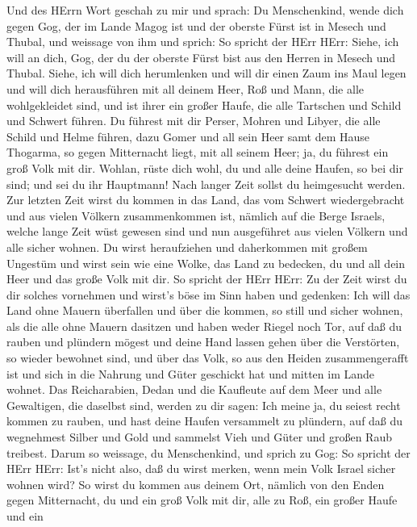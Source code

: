  Und des HErrn Wort geschah zu mir und sprach: 
Du Menschenkind, wende dich gegen Gog, der im Lande Magog ist und der
oberste Fürst ist in Mesech und Thubal, und weissage von ihm
 und sprich: So spricht der HErr HErr: Siehe, ich will an
dich, Gog, der du der oberste Fürst bist aus den Herren in Mesech und
Thubal.  Siehe, ich will dich herumlenken und will dir einen
Zaum ins Maul legen und will dich herausführen mit all deinem Heer, Roß
und Mann, die alle wohlgekleidet sind, und ist ihrer ein großer Haufe,
die alle Tartschen und Schild und Schwert führen.  Du
führest mit dir Perser, Mohren und Libyer, die alle Schild und Helme
führen,  dazu Gomer und all sein Heer samt dem Hause
Thogarma, so gegen Mitternacht liegt, mit all seinem Heer; ja, du
führest ein groß Volk mit dir.  Wohlan, rüste dich wohl, du
und alle deine Haufen, so bei dir sind; und sei du ihr Hauptmann!
 Nach langer Zeit sollst du heimgesucht werden. Zur letzten
Zeit wirst du kommen in das Land, das vom Schwert wiedergebracht und aus
vielen Völkern zusammenkommen ist, nämlich auf die Berge Israels, welche
lange Zeit wüst gewesen sind und nun ausgeführet aus vielen Völkern und
alle sicher wohnen.  Du wirst heraufziehen und daherkommen
mit großem Ungestüm und wirst sein wie eine Wolke, das Land zu bedecken,
du und all dein Heer und das große Volk mit dir.  So
spricht der HErr HErr: Zu der Zeit wirst du dir solches vornehmen und
wirst's böse im Sinn haben  und gedenken: Ich will das Land
ohne Mauern überfallen und über die kommen, so still und sicher wohnen,
als die alle ohne Mauern dasitzen und haben weder Riegel noch Tor,
 auf daß du rauben und plündern mögest und deine Hand
lassen gehen über die Verstörten, so wieder bewohnet sind, und über das
Volk, so aus den Heiden zusammengerafft ist und sich in die Nahrung und
Güter geschickt hat und mitten im Lande wohnet.  Das
Reicharabien, Dedan und die Kaufleute auf dem Meer und alle Gewaltigen,
die daselbst sind, werden zu dir sagen: Ich meine ja, du seiest recht
kommen zu rauben, und hast deine Haufen versammelt zu plündern, auf daß
du wegnehmest Silber und Gold und sammelst Vieh und Güter und großen
Raub treibest.  Darum so weissage, du Menschenkind, und
sprich zu Gog: So spricht der HErr HErr: Ist's nicht also, daß du wirst
merken, wenn mein Volk Israel sicher wohnen wird?  So wirst
du kommen aus deinem Ort, nämlich von den Enden gegen Mitternacht, du
und ein groß Volk mit dir, alle zu Roß, ein großer Haufe und ein
